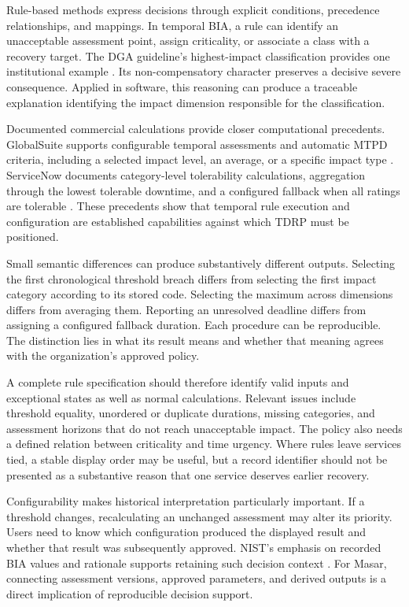 Rule-based methods express decisions through explicit conditions, precedence relationships, and mappings. In temporal BIA, a rule can identify an unacceptable assessment point, assign criticality, or associate a class with a recovery target. The DGA guideline's highest-impact classification provides one institutional example \cite{dga2025guidelineen}. Its non-compensatory character preserves a decisive severe consequence. Applied in software, this reasoning can produce a traceable explanation identifying the impact dimension responsible for the classification.

Documented commercial calculations provide closer computational precedents. GlobalSuite supports configurable temporal assessments and automatic MTPD criteria, including a selected impact level, an average, or a specific impact type \cite{globalsuite2025prebia}. ServiceNow documents category-level tolerability calculations, aggregation through the lowest tolerable downtime, and a configured fallback when all ratings are tolerable \cite{servicenow2025rto}. These precedents show that temporal rule execution and configuration are established capabilities against which TDRP must be positioned.

Small semantic differences can produce substantively different outputs. Selecting the first chronological threshold breach differs from selecting the first impact category according to its stored code. Selecting the maximum across dimensions differs from averaging them. Reporting an unresolved deadline differs from assigning a configured fallback duration. Each procedure can be reproducible. The distinction lies in what its result means and whether that meaning agrees with the organization's approved policy.

A complete rule specification should therefore identify valid inputs and exceptional states as well as normal calculations. Relevant issues include threshold equality, unordered or duplicate durations, missing categories, and assessment horizons that do not reach unacceptable impact. The policy also needs a defined relation between criticality and time urgency. Where rules leave services tied, a stable display order may be useful, but a record identifier should not be presented as a substantive reason that one service deserves earlier recovery.

Configurability makes historical interpretation particularly important. If a threshold changes, recalculating an unchanged assessment may alter its priority. Users need to know which configuration produced the displayed result and whether that result was subsequently approved. NIST's emphasis on recorded BIA values and rationale supports retaining such decision context \cite{quinn2025bia}. For Masar, connecting assessment versions, approved parameters, and derived outputs is a direct implication of reproducible decision support.

